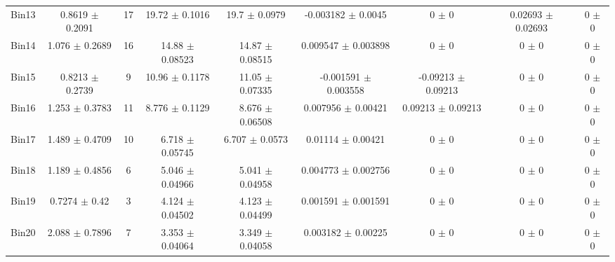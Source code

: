 \begin{tabular}{@{\extracolsep{4pt}}lcccccccc@{}}
     Bin13 & 0.8619 $\pm$ 0.2091 & 17 & 19.72 $\pm$ 0.1016 & 19.7 $\pm$ 0.0979 & -0.003182 $\pm$ 0.0045 & 0 $\pm$ 0 & 0.02693 $\pm$ 0.02693 & 0 $\pm$ 0 \\ 
     Bin14 & 1.076 $\pm$ 0.2689 & 16 & 14.88 $\pm$ 0.08523 & 14.87 $\pm$ 0.08515 & 0.009547 $\pm$ 0.003898 & 0 $\pm$ 0 & 0 $\pm$ 0 & 0 $\pm$ 0 \\ 
     Bin15 & 0.8213 $\pm$ 0.2739 & 9 & 10.96 $\pm$ 0.1178 & 11.05 $\pm$ 0.07335 & -0.001591 $\pm$ 0.003558 & -0.09213 $\pm$ 0.09213 & 0 $\pm$ 0 & 0 $\pm$ 0 \\ 
     Bin16 & 1.253 $\pm$ 0.3783 & 11 & 8.776 $\pm$ 0.1129 & 8.676 $\pm$ 0.06508 & 0.007956 $\pm$ 0.00421 & 0.09213 $\pm$ 0.09213 & 0 $\pm$ 0 & 0 $\pm$ 0 \\ 
     Bin17 & 1.489 $\pm$ 0.4709 & 10 & 6.718 $\pm$ 0.05745 & 6.707 $\pm$ 0.0573 & 0.01114 $\pm$ 0.00421 & 0 $\pm$ 0 & 0 $\pm$ 0 & 0 $\pm$ 0 \\ 
     Bin18 & 1.189 $\pm$ 0.4856 & 6 & 5.046 $\pm$ 0.04966 & 5.041 $\pm$ 0.04958 & 0.004773 $\pm$ 0.002756 & 0 $\pm$ 0 & 0 $\pm$ 0 & 0 $\pm$ 0 \\ 
     Bin19 & 0.7274 $\pm$ 0.42 & 3 & 4.124 $\pm$ 0.04502 & 4.123 $\pm$ 0.04499 & 0.001591 $\pm$ 0.001591 & 0 $\pm$ 0 & 0 $\pm$ 0 & 0 $\pm$ 0 \\ 
     Bin20 & 2.088 $\pm$ 0.7896 & 7 & 3.353 $\pm$ 0.04064 & 3.349 $\pm$ 0.04058 & 0.003182 $\pm$ 0.00225 & 0 $\pm$ 0 & 0 $\pm$ 0 & 0 $\pm$ 0 \\ 
\hline\hline
  \end{tabular}
